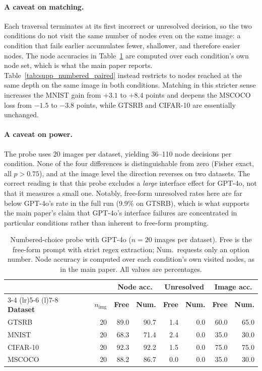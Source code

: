 \documentclass[10pt,twocolumn,letterpaper]{article}
\begin{document}
\paragraph{A caveat on matching.} Each traversal terminates at its first
incorrect or unresolved decision, so the two conditions do not visit the same
number of nodes even on the same image: a condition that fails earlier
accumulates fewer, shallower, and therefore easier nodes. The node accuracies
in Table~\ref{tab:supp_numbered} are computed over each condition's own node
set, which is what the main paper reports.
Table~\ref{tab:supp_numbered_paired} instead restricts to nodes reached at the
same depth on the same image in both conditions. Matching in this stricter
sense increases the MNIST gain from $+3.1$ to $+8.4$ points and deepens the
MSCOCO loss from $-1.5$ to $-3.8$ points, while GTSRB and CIFAR-10 are
essentially unchanged.

\paragraph{A caveat on power.} The probe uses 20 images per dataset, yielding
36--110 node decisions per condition. None of the four differences is
distinguishable from zero (Fisher exact, all $p > 0.75$), and at the image
level the direction reverses on two datasets. The correct reading is that this
probe excludes a \emph{large} interface effect for GPT-4o, not that it measures
a small one. Notably, free-form unresolved rates here are far below GPT-4o's
rate in the full run (9.9\% on GTSRB), which is what supports the main paper's
claim that GPT-4o's interface failures are concentrated in particular
conditions rather than inherent to free-form prompting.


\begin{table}[t]
\centering
\caption{Numbered-choice probe with GPT-4o ($n{=}20$ images per dataset). Free is the free-form prompt with strict regex extraction; Num.\ requests only an option number. Node accuracy is computed over each condition's own visited nodes, as in the main paper. All values are percentages.}
\label{tab:supp_numbered}
\footnotesize
\setlength{\tabcolsep}{4pt}
\begin{tabular}{@{}lrrrrrrr@{}}
\toprule
& & \multicolumn{2}{c}{\textbf{Node acc.}} & \multicolumn{2}{c}{\textbf{Unresolved}} & \multicolumn{2}{c}{\textbf{Image acc.}} \\
\cmidrule(lr){3-4} \cmidrule(lr){5-6} \cmidrule(l){7-8}
\textbf{Dataset} & $n_{\text{img}}$ & \textbf{Free} & \textbf{Num.} & \textbf{Free} & \textbf{Num.} & \textbf{Free} & \textbf{Num.} \\
\midrule
GTSRB     & 20 & 89.0 & 90.7 & 1.4 & 0.0 & 60.0 & 65.0 \\
MNIST     & 20 & 68.3 & 71.4 & 2.4 & 0.0 & 35.0 & 30.0 \\
CIFAR-10  & 20 & 92.3 & 92.2 & 1.5 & 0.0 & 75.0 & 75.0 \\
MSCOCO    & 20 & 88.2 & 86.7 & 0.0 & 0.0 & 35.0 & 30.0 \\
\bottomrule
\end{tabular}
\end{table}
\end{document}
